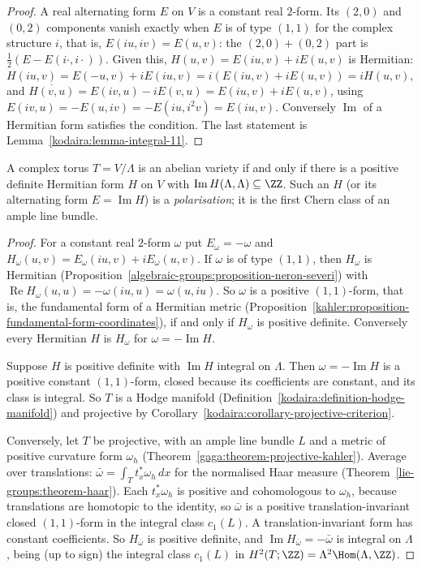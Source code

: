 \begin{proof}
A real alternating form $E$ on $V$ is a constant real $2$-form. Its $(2,0)$ and $(0,2)$ components vanish exactly when $E$ is of type $(1,1)$ for the complex structure $i$,
that is, $E(iu, iv) = E(u, v)$: the $(2,0) + (0,2)$ part is $\frac12(E - E(i\cdot, i\cdot))$. Given this, $H(u, v) = E(iu, v) + iE(u, v)$ is Hermitian:
$H(iu, v) = E(-u, v) + iE(iu, v) = i(E(iu, v) + iE(u, v)) = iH(u, v)$, and $\overline{H(v, u)} = E(iv, u) - iE(v, u) = E(iu, v) + iE(u, v)$, using $E(iv, u) = -E(u, iv) = -E(iu, i^2v) = E(iu, v)$.
Conversely $\operatorname{Im}$ of a Hermitian form satisfies the condition. The last statement is Lemma~\ref{kodaira:lemma-integral-11}.
\end{proof}

\begin{theorem}[Riemann]\label{algebraic-groups:theorem-riemann-conditions}
A complex torus $T = V/\Lambda$ is an abelian variety if and only if there is a positive definite Hermitian form $H$ on $V$ with $\operatorname{Im}H(\Lambda, \Lambda) \subseteq \ZZ$.
Such an $H$ (or its alternating form $E = \operatorname{Im}H$) is a \emph{polarisation}; it is the first Chern class of an ample line bundle.
\end{theorem}

\begin{proof}
For a constant real $2$-form $\omega$ put $E_\omega = -\omega$ and $H_\omega(u, v) = E_\omega(iu, v) + iE_\omega(u, v)$. If $\omega$ is of type $(1,1)$, then $H_\omega$ is Hermitian
(Proposition~\ref{algebraic-groups:proposition-neron-severi}) with $\operatorname{Re}H_\omega(u, u) = -\omega(iu, u) = \omega(u, iu)$. So $\omega$ is a positive $(1,1)$-form, that is, the
fundamental form of a Hermitian metric (Proposition~\ref{kahler:proposition-fundamental-form-coordinates}), if and only if $H_\omega$ is positive definite. Conversely every Hermitian $H$ is
$H_\omega$ for $\omega = -\operatorname{Im}H$.

Suppose $H$ is positive definite with $\operatorname{Im}H$ integral on $\Lambda$. Then $\omega = -\operatorname{Im}H$ is a positive constant $(1,1)$-form, closed because its coefficients
are constant, and its class is integral. So $T$ is a Hodge manifold (Definition~\ref{kodaira:definition-hodge-manifold}) and projective by
Corollary~\ref{kodaira:corollary-projective-criterion}.

Conversely, let $T$ be projective, with an ample line bundle $L$ and a metric of positive curvature form $\omega_h$ (Theorem~\ref{gaga:theorem-projective-kahler}). Average over translations:
$\bar\omega = \int_Tt_x^*\omega_h\,dx$ for the normalised Haar measure (Theorem~\ref{lie-groups:theorem-haar}). Each $t_x^*\omega_h$ is positive and cohomologous to $\omega_h$, because
translations are homotopic to the identity, so $\bar\omega$ is a positive translation-invariant closed $(1,1)$-form in the integral class $c_1(L)$. A translation-invariant form has constant
coefficients. So $H_{\bar\omega}$ is positive definite, and $\operatorname{Im}H_{\bar\omega} = -\bar\omega$ is integral on $\Lambda$, being (up to sign) the integral class $c_1(L)$ in
$H^2(T; \ZZ) = \Lambda^2\Hom(\Lambda, \ZZ)$.
\end{proof}

